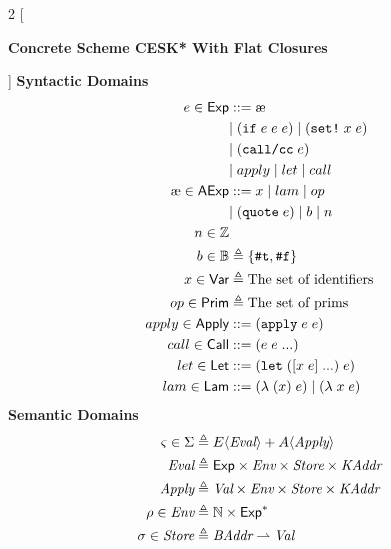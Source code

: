 \documentclass[12pt,draft]{article}
\newcommand\mae{\ensuremath{\text{\ae}}}
\newcommand{\letsyn}[3]{(\texttt{let}\;([#1\;#2]\;...)\;#3)}
\newcommand{\ifsyn}[3]{(\texttt{if}\;#1\;#2\;#3)}
\newcommand{\applysyn}[2]{(\texttt{apply}\;#1\;#2)}
\newcommand{\callccsyn}[1]{(\texttt{call/cc}\;#1)}
\newcommand{\setsyn}[2]{(\texttt{set!}\;#1\;#2)}
\newcommand{\quotesyn}[1]{(\texttt{quote}\;#1)}
\newcommand{\truesyn}{\texttt{\#t}}
\newcommand{\falsesyn}{\texttt{\#f}}
\begin{document}
\begin{multicols*}{2}
  [
  \begin{center}
    \textbf{Concrete Scheme CESK* With Flat Closures} \\
  \end{center}
  ]
  \noindent
  \textbf{Syntactic Domains}
  \begin{align*}
    e \in \cExp &::= \mae \\
                & |\; \ifsyn{e}{e}{e} \;|\; \setsyn{x}{e} \\
                &|\; \callccsyn{e} \\
                &|\; apply \;|\; let \;|\; call \\
    \mae \in \textsf{AExp} &::= x \;|\; lam \;|\; op \\
                &|\; \quotesyn{e} \;|\; b \;|\; n \\
    n \in \mathbb{Z} &\\
    b \in \mathbb{B} &\triangleq \{\truesyn , \falsesyn\} \\
    x \in \cVar &\triangleq \text{The set of identifiers} \\
    op \in \cPrim &\triangleq \text{The set of prims} \\
    apply \in \cApply &::= \applysyn{e}{e} \\
    call \in \cCall &::= (e \; e \; ...) \\
    let \in \cLet &::= \letsyn{x}{e}{e} \\
    lam \in \cLam &::= (\lambda \; (x) \; e) \;|\; (\lambda \; x \; e)
  \end{align*}
  \vfill\null
  \columnbreak
  \noindent
  \textbf{Semantic Domains}
  \begin{align*}
    \cstate \in \cState &\triangleq E\langle \textit{Eval} \rangle
                          + A\langle \textit{Apply} \rangle \\
    \textit{Eval} &\triangleq \cExp \times \cEnv \times \cStore \times \cKAddr \\
    \textit{Apply} &\triangleq \cVal \times \cEnv \times \cStore \times \cKAddr \\
    \cenv \in \cEnv &\triangleq \mathbb{N} \times \cExp^* \\
    \cstore \in \cStore &\triangleq \cBAddr
                                 \rightharpoonup \cVal \\

\end{align*}
\end{multicols*}
\end{document}
